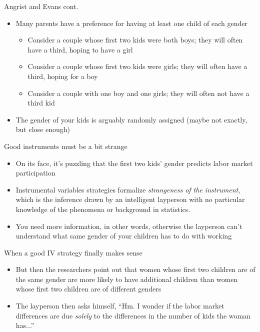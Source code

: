 \documentclass{beamer}
\begin{document}
\begin{frame}{Angrist and Evans cont.}

  \begin{itemize}

    \item Many parents have a preference for having at least one child of each gender
          \begin{itemize}
            \item Consider a couple whose first two kids were both boys; they will often have a third, hoping to have a girl
            \item Consider a couple whose first two kids were girls; they will often have a third, hoping for a boy
            \item Consider a couple with one boy and one girls; they will often not have a third kid
          \end{itemize}
    \item The gender of your kids is arguably randomly assigned (maybe not exactly, but close enough)
  \end{itemize}

\end{frame}



\begin{frame}{Good instruments must be a bit strange}

  \begin{itemize}
    \item On its face, it's puzzling that the first two kids' gender predicts labor market participation
    \item Instrumental variables strategies formalize \emph{strangeness of the instrument}, which is the inference drawn by an intelligent layperson with no particular knowledge of the phenomena or background in statistics.
    \item You need more information, in other words, otherwise the layperson can't understand what same gender of your children has to do with working
  \end{itemize}

\end{frame}

\begin{frame}{When a good IV strategy finally makes sense}

  \begin{itemize}
    \item But then the researchers point out that women whose first two children are of the same gender are more likely to have additional children than women whose first two children are of different genders
    \item The layperson then asks himself, ``Hm. I wonder if the labor market differences are due \emph{solely} to the differences in the number of kids the woman has...''

  \end{itemize}

\end{frame}
\end{document}
